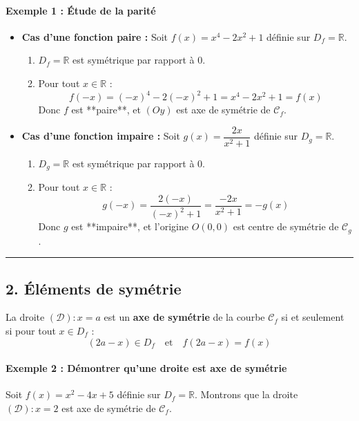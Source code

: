 \documentclass[12pt,a4paper]{article}
\begin{document}
\paragraph{Exemple 1 : Étude de la parité}
\begin{itemize}
    \item \textbf{Cas d'une fonction paire :} Soit $f(x) = x^4 - 2x^2 + 1$ définie sur $D_f = \mathbb{R}$.
    \begin{enumerate}
        \item $D_f = \mathbb{R}$ est symétrique par rapport à $0$.
        \item Pour tout $x \in \mathbb{R}$ :
        \[
        f(-x) = (-x)^4 - 2(-x)^2 + 1 = x^4 - 2x^2 + 1 = f(x)
        \]
        Donc $f$ est **paire**, et $(Oy)$ est axe de symétrie de $\mathcal{C}_f$.
    \end{enumerate}

    \item \textbf{Cas d'une fonction impaire :} Soit $g(x) = \dfrac{2x}{x^2 + 1}$ définie sur $D_g = \mathbb{R}$.
    \begin{enumerate}
        \item $D_g = \mathbb{R}$ est symétrique par rapport à $0$.
        \item Pour tout $x \in \mathbb{R}$ :
        \[
        g(-x) = \frac{2(-x)}{(-x)^2 + 1} = \frac{-2x}{x^2 + 1} = -g(x)
        \]
        Donc $g$ est **impaire**, et l'origine $O(0,0)$ est centre de symétrie de $\mathcal{C}_g$.
    \end{enumerate}
\end{itemize}

\vspace{0.3cm}
\hrule
\vspace{0.3cm}

\subsection*{\color{myred}2. Éléments de symétrie}

\begin{tcolorbox}[colback=gray!5!white,colframe=black,title=\textbf{Propriété 1 : Axe de symétrie}]
La droite $(\mathcal{D}) : x = a$ est un \textbf{axe de symétrie} de la courbe $\mathcal{C}_f$ si et seulement si pour tout $x \in D_f$ :
\[
(2a - x) \in D_f \quad \text{et} \quad f(2a - x) = f(x)
\]
\end{tcolorbox}

\paragraph{Exemple 2 : Démontrer qu'une droite est axe de symétrie}
Soit $f(x) = x^2 - 4x + 5$ définie sur $D_f = \mathbb{R}$. Montrons que la droite $(\mathcal{D}) : x = 2$ est axe de symétrie de $\mathcal{C}_f$.
\end{document}
